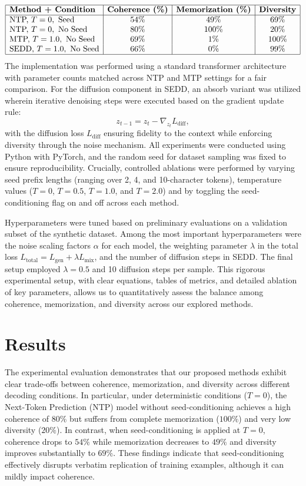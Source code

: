 \documentclass{article} %
\begin{document}
\[
\begin{array}{|l|c|c|c|}
\hline
\textbf{Method + Condition} & \textbf{Coherence (\%)} & \textbf{Memorization (\%)} & \textbf{Diversity} \\
\hline
\text{NTP, }T=0,\ \text{Seed} & 54\% & 49\% & 69\% \\
\text{NTP, }T=0,\ \text{No Seed} & 80\% & 100\% & 20\% \\
\text{MTP, }T=1.0,\ \text{No Seed} & 69\% & 1\% & 100\% \\
\text{SEDD, }T=1.0,\ \text{No Seed} & 66\% & 0\% & 99\% \\
\hline
\end{array}
\]
%
The implementation was performed using a standard transformer architecture with parameter counts matched across NTP and MTP settings for a fair comparison. For the diffusion component in SEDD, an absorb variant was utilized wherein iterative denoising steps were executed based on the gradient update rule:
\[
z_{t-1} = z_t - \nabla_{z_t} L_{\text{diff}},
\]
with the diffusion loss \( L_{\text{diff}} \) ensuring fidelity to the context while enforcing diversity through the noise mechanism. All experiments were conducted using Python with PyTorch, and the random seed for dataset sampling was fixed to ensure reproducibility. Crucially, controlled ablations were performed by varying seed prefix lengths (ranging over 2, 4, and 10-character tokens), temperature values (\(T=0\), \(T=0.5\), \(T=1.0\), and \(T=2.0\)) and by toggling the seed-conditioning flag on and off across each method.

Hyperparameters were tuned based on preliminary evaluations on a validation subset of the synthetic dataset. Among the most important hyperparameters were the noise scaling factors \(\alpha\) for each model, the weighting parameter \(\lambda\) in the total loss \( L_{\text{total}} = L_{\text{gen}} + \lambda L_{\text{mix}} \), and the number of diffusion steps in SEDD. The final setup employed \(\lambda = 0.5\) and 10 diffusion steps per sample. This rigorous experimental setup, with clear equations, tables of metrics, and detailed ablation of key parameters, allows us to quantitatively assess the balance among coherence, memorization, and diversity across our explored methods.

\section{Results}
The experimental evaluation demonstrates that our proposed methods exhibit clear trade-offs between coherence, memorization, and diversity across different decoding conditions. In particular, under deterministic conditions (\(T=0\)), the Next-Token Prediction (NTP) model without seed-conditioning achieves a high coherence of \(80\%\) but suffers from complete memorization (\(100\%\)) and very low diversity (\(20\%\)). In contrast, when seed-conditioning is applied at \(T=0\), coherence drops to \(54\%\) while memorization decreases to \(49\%\) and diversity improves substantially to \(69\%\). These findings indicate that seed-conditioning effectively disrupts verbatim replication of training examples, although it can mildly impact coherence.
\end{document}
